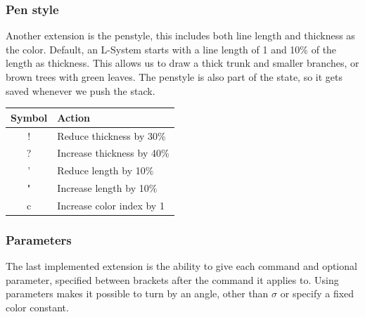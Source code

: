 \documentclass[11pt,a4paper]{article}
\begin{document}
\subsubsection{Pen style}
Another extension is the penstyle, this includes both line length and thickness as the color. Default, an L-System starts with a line length of 1 and 10\% of the length as thickness. This allows us to draw a thick trunk and smaller branches, or brown trees with green leaves. The penstyle is also part of the state, so it gets saved whenever we push the stack.

\begin{center}
\begin{tabular}{c | l}
Symbol & Action \\ \hline
! & Reduce thickness by 30\% \\
? & Increase thickness by 40\% \\
' & Reduce length by 10\% \\
" & Increase length by 10\% \\
c & Increase color index by 1
\end{tabular}
\end{center}


\subsubsection{Parameters}
The last implemented extension is the ability to give each command and optional parameter, specified between brackets after the command it applies to. Using parameters makes it possible to turn by an angle, other than $\sigma$ or specify a fixed color constant.
\end{document}
